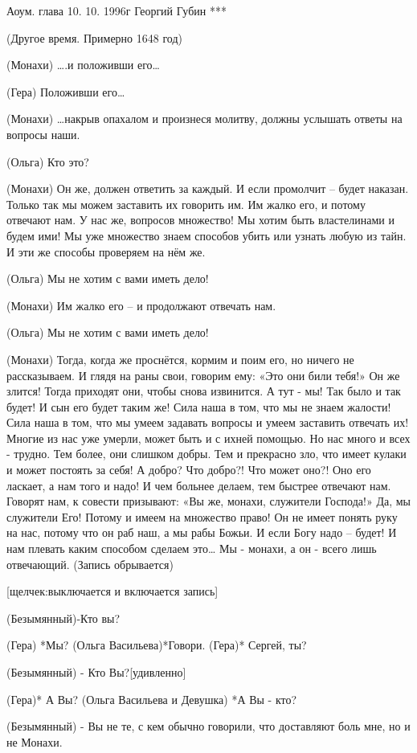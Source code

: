 Аоум. глава 10. 10. 1996г
Георгий Губин
***

 (Другое время. Примерно 1648 год) 

 (Монахи) ….и положивши его…

 (Гера)   Положивши его…

 (Монахи) …накрыв опахалом и произнеся молитву, должны услышать ответы на вопросы наши.

 (Ольга)  Кто это?

 (Монахи)  Он же, должен ответить за каждый. И если промолчит – будет наказан. Только так мы можем заставить их говорить им.  Им жалко его, и потому отвечают нам. У нас же, вопросов множество!  Мы хотим быть властелинами и будем ими! Мы уже множество знаем способов убить или узнать любую из тайн. И эти же способы проверяем на нём же. 

 (Ольга)  Мы не хотим с вами иметь дело!

 (Монахи) Им жалко его – и продолжают отвечать нам. 

 (Ольга)  Мы не хотим с вами иметь дело!

 (Монахи) Тогда, когда же проснётся, кормим и поим его, но ничего не рассказываем. И глядя на раны свои, говорим ему: «Это они били тебя!» Он же злится! Тогда приходят они, чтобы снова извинится. А тут - мы! Так было и так будет! И сын его будет таким же!  Сила наша в том, что мы не знаем жалости! Сила наша в том, что мы умеем задавать вопросы и умеем заставить отвечать их!  Многие из нас уже умерли, может быть и с ихней помощью. Но нас много и всех - трудно. Тем более,  они слишком добры.  Тем и прекрасно зло, что имеет кулаки и может постоять за себя!  А добро? Что добро?! Что может оно?! Оно его ласкает, а нам того и надо! И чем больнее делаем, тем быстрее отвечают нам. Говорят нам, к совести призывают: «Вы же, монахи, служители Господа!» Да, мы служители Его! Потому и имеем на множество право! Он не имеет понять руку на нас, потому что он раб наш, а мы рабы Божьи. И если Богу надо – будет! И нам плевать каким способом сделаем это… Мы - монахи, а он - всего лишь отвечающий. (Запись обрывается) 

[щелчек:выключается и включается запись]

(Безымянный)-Кто вы?

(Гера) *Мы?
(Ольга Васильева)*Говори.
(Гера)* Сергей, ты?

(Безымянный) - Кто Вы?[удивленно]

(Гера)* А Вы?
(Ольга Васильева и Девушка) *А Вы - кто?

(Безымянный) - Вы не те, с кем обычно говорили, что доставляют боль мне, но и не Монахи.

